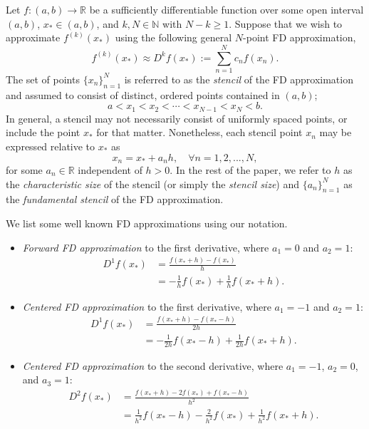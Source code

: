 \documentclass[12pt]{article}
\newcommand{\N}{\mathbb{N}}
\newcommand{\R}{\mathbb{R}}
\newcommand{\xstar}{x_*}
\newcommand{\FD}{D}
\begin{document}
Let $f:(a,b)\to\R$ be a sufficiently differentiable function over some open interval $(a,b)$, $\xstar\in(a,b)$, and $k, N\in\N$ with $N-k\ge 1$.
Suppose that we wish to approximate $f^{(k)}(\xstar)$ using the following general $N$-point FD approximation,
\[
	f^{(k)}(\xstar) \approx \FD^kf(\xstar):= \sum_{n=1}^N c_n f(x_n).
\]
The set of points $\{x_n\}_{n=1}^N$ is referred to as the \textit{stencil} of the FD approximation and assumed to consist of distinct, ordered points contained in $(a,b)$;
\[
	a< x_1 < x_2 < \cdots  < x_{N-1} < x_{N} < b.
\]
In general, a stencil may not necessarily consist of uniformly spaced points, or include the point $\xstar$ for that matter.
Nonetheless, each stencil point $x_n$ may be expressed relative to $\xstar$ as
\[
	x_n = \xstar+a_n h, \quad \forall n=1,2,...,N,
\]
for some $a_n\in\R$ independent of $h>0$.
In the rest of the paper, we refer to $h$ as the \textit{characteristic size} of the stencil (or simply the \textit{stencil size}) and $\{a_n\}_{n=1}^N$ as the \textit{fundamental stencil} of the FD approximation.

We list some well known FD approximations using our notation.
%
\begin{itemize}
\item \textit{Forward FD approximation} to the first derivative, where $a_1=0$ and $a_2=1$:
\begin{align*}
	\FD^1f(\xstar) 
    	&= \frac{f(\xstar+h)-f(\xstar)}{h}\\
    	&= -\frac{1}{h}f(\xstar) + \frac{1}{h}f(\xstar+h).
\end{align*} 
\item \textit{Centered FD approximation} to the first derivative, where $a_1=-1$ and $a_2=1$:
\begin{align*}
	\FD^1f(\xstar) 
	&= \frac{f(\xstar+h)-f(\xstar-h)}{2h}\\
	&= -\frac{1}{2h}f(\xstar-h) + \frac{1}{2h}f(\xstar+h).
\end{align*}
\item \textit{Centered FD approximation} to the second derivative, where $a_1=-1$, $a_2=0$, and $a_3=1$:
\begin{align*}
	\FD^2f(\xstar) 
	&=\frac{f(\xstar+h)-2f(\xstar)+f(\xstar-h)}{h^2}\\
	&= \frac{1}{h^2}f(\xstar-h)-\frac{2}{h^2}f(\xstar) + \frac{1}{h^2}f(\xstar+h). 
\end{align*}
\end{itemize} 
\end{document}
